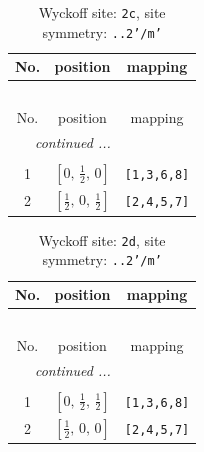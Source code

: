 \documentclass[fleqn,8pt]{jsarticle}
\begin{document}
\renewcommand{\arraystretch}{1.2}
\begin{longtable}{ccc}
\caption{Wyckoff site: {\tt 2c}, site symmetry: {\tt ..2'/m'}}
 \\
 \hline \hline
No. & position & mapping \\ \hline \endfirsthead

\multicolumn{2}{l}{\tablename\ \thetable{}} \\
 \hline \hline
No. & position & mapping \\ \hline \endhead

 \hline \hline
\multicolumn{2}{r}{\footnotesize\it continued ...} \\ \endfoot

 \hline \hline
\multicolumn{2}{r}{} \\ \endlastfoot

1 & $\left[ 0,\, \frac{1}{2},\, 0 \right]$ & {\tt [1,3,6,8]} \\ \hline
2 & $\left[ \frac{1}{2},\, 0,\, \frac{1}{2} \right]$ & {\tt [2,4,5,7]} \\
\end{longtable}
\renewcommand{\arraystretch}{1.2}
\begin{longtable}{ccc}
\caption{Wyckoff site: {\tt 2d}, site symmetry: {\tt ..2'/m'}}
 \\
 \hline \hline
No. & position & mapping \\ \hline \endfirsthead

\multicolumn{2}{l}{\tablename\ \thetable{}} \\
 \hline \hline
No. & position & mapping \\ \hline \endhead

 \hline \hline
\multicolumn{2}{r}{\footnotesize\it continued ...} \\ \endfoot

 \hline \hline
\multicolumn{2}{r}{} \\ \endlastfoot

1 & $\left[ 0,\, \frac{1}{2},\, \frac{1}{2} \right]$ & {\tt [1,3,6,8]} \\ \hline
2 & $\left[ \frac{1}{2},\, 0,\, 0 \right]$ & {\tt [2,4,5,7]} \\
\end{longtable}
\renewcommand{\arraystretch}{1.2}
\end{document}

